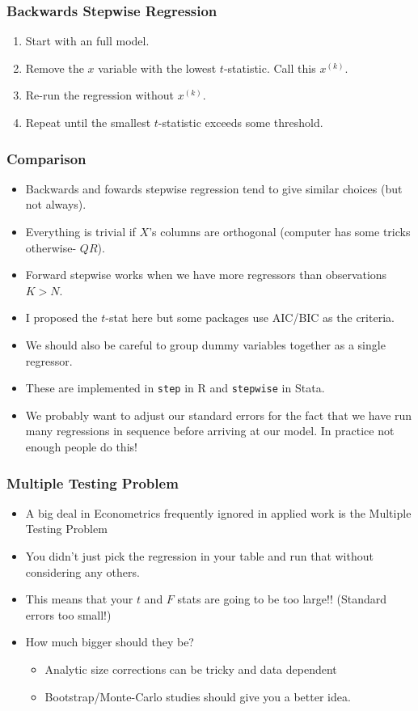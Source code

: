 \documentclass[xcolor=pdftex,dvipsnames,table,mathserif,aspectratio=169]{beamer}
\begin{document}
\begin{frame}
\frametitle{Backwards Stepwise Regression}
\begin{enumerate}
\item Start with an full model.
\item Remove the $x$ variable with the lowest $t$-statistic. Call this $x^{(k)}$.
\item Re-run the regression without $x^{(k)}$.
\item Repeat until the smallest $t$-statistic exceeds some threshold.
\end{enumerate}
\end{frame}


\begin{frame}
\frametitle{Comparison}
\begin{itemize}
\item Backwards and fowards stepwise regression tend to give similar choices (but not always).
\item Everything is trivial if $X$'s columns are orthogonal (computer has some tricks otherwise- $QR$).
\item Forward stepwise works when we have more regressors than observations $K > N$.
\item I proposed the $t$-stat here but some packages use AIC/BIC as the criteria.
\item We should also be careful to \alert{group dummy variables together} as a single regressor.
\item These are implemented in \texttt{step} in R and \texttt{stepwise} in Stata.
\item We probably want to adjust our standard errors for the fact that we have run many regressions in sequence before arriving at our model. \alert{In practice not enough people do this!}
\end{itemize}
\end{frame}

\begin{frame}
\frametitle{Multiple Testing Problem}
\begin{itemize}
\item A big deal in Econometrics frequently ignored in applied work is the \alert{Multiple Testing Problem}
\item You didn't just pick the regression in your table and run that without considering any others.
\item This means that your $t$ and $F$ stats are going to be too large!! (Standard errors too small!)
\item How much bigger should they be?
\begin{itemize}
\item Analytic size corrections can be tricky and data dependent
\item Bootstrap/Monte-Carlo studies should give you a better idea.
\end{itemize}
\end{itemize}
\end{frame}
\end{document}
